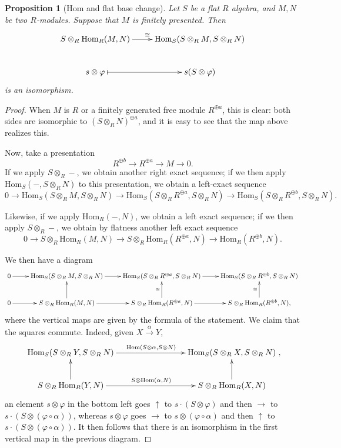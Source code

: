 \documentclass{amsart}[12pt]
\newcommand{\Hom}{\mathrm{Hom}}
\numberwithin{equation}{section}
\theoremstyle{plain} %
\newtheorem{proposition}[equation]{Proposition}
\theoremstyle{definition}
\theoremstyle{remark}
\begin{document}
\begin{proposition}[Hom and flat base change]
	Let $S$ be a flat $R$ algebra, and $M,N$ be two $R$-modules. Suppose that $M$ is finitely presented. Then 
	\[\xymatrix{ S\otimes_R \Hom_R(M,N) \ar[r]^{\cong} & \Hom_{S} (S\otimes_R M, S\otimes_R N) \\
	s\otimes \varphi \ar@{|->}[r] & s(S\otimes \varphi)}\]
is an isomorphism.
\end{proposition}
\begin{proof}
	When $M$ is $R$ or a finitely generated free module $R^{\oplus a}$, this is clear: both sides are isomorphic to $(S\otimes_R N)^{\oplus a}$, and it is easy to see that the map above realizes this.
	
	Now, take a presentation 
	\[R^{\oplus b} \to R^{\oplus a} \to M \to 0.\]
	 If we apply $S\otimes_R -$, we obtain another right exact sequence; if we then apply $\Hom_S(-,S\otimes_R N)$ to this presentation, we obtain a left-exact sequence 
	 \[0 \to \Hom_{S} (S\otimes_R M, S\otimes_R N) \to \Hom_{S} (S\otimes_R  R^{\oplus a}, S\otimes_R N) \to \Hom_{S} (S\otimes_R R^{\oplus b}, S\otimes_R N).  \]
	 
	Likewise, if we apply $\Hom_R(-,N)$, we obtain a left exact sequence; if we then apply $S\otimes_R -$, we obtain by flatness another left exact sequence
	\[ 0\to S\otimes_R \Hom_R(M,N) \to S\otimes_R \Hom_R(R^{\oplus a},N) \to \Hom_R(R^{\oplus b},N). \]
	
	We then have a diagram
	\[\xymatrix{ 0 \ar[r] & \Hom_{S} (S\otimes_R M, S\otimes_R N) \ar[r] & \Hom_{S} (S\otimes_R  R^{\oplus a}, S\otimes_R N) \ar[r] & \Hom_S(S\otimes_R R^{\oplus b}, S\otimes_R N) \\
		0 \ar[r] &  S\otimes_R \Hom_R(M,N) \ar[r]\ar[u] & S\otimes_R \Hom_R(R^{\oplus a},N) \ar[r]\ar[u]^-{\cong} & S \otimes_R \Hom_R(R^{\oplus b},N) \ar[u]^-{\cong},} \]
	where the vertical maps are given by the formula of the statement. We claim that the squares commute. Indeed, given $X\xrightarrow{\alpha} Y$,  
	\[\xymatrix{  \Hom_{S} (S\otimes_R Y, S\otimes_R N) \ar[rrr]^{\Hom(S\otimes \alpha, S \otimes N)} & & & \Hom_{S} (S\otimes_R  X, S\otimes_R N)  \\
		 S\otimes_R \Hom_R(Y,N) \ar[rrr]^{S \otimes \Hom(\alpha,N)} \ar[u] & & & S\otimes_R \Hom_R(X,N) \ar[u]}, \]
		 an element $s\otimes \varphi$ in the bottom left goes $\uparrow$ to $s \cdot (S\otimes \varphi)$ and then $\rightarrow$ to $s \cdot (S \otimes (\varphi \circ \alpha))$, whereas $s\otimes \varphi$ goes $\rightarrow$ to $s \otimes (\varphi\circ \alpha)$ and then $\uparrow$ to $s \cdot (S\otimes (\varphi \circ \alpha))$.
		 It then follows that there is an isomorphism in the first vertical map in the previous diagram.
\end{proof}
\end{document}
